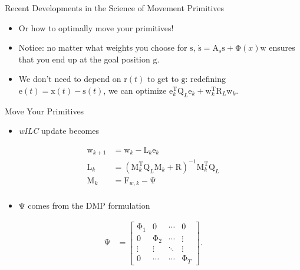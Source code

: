 \documentclass[handout]{beamer}
\newcommand{\boldvec}[1]{\boldsymbol{\mathrm{#1}}}
\let\vec\boldvec
\newcommand{\state}{\vec{x}} %
\newcommand{\dmp}{\vec{s}} %
\newcommand{\error}{\vec{e}} %
\newcommand{\traj}{\vec{r}} %
\newcommand{\goal}{\vec{g}} %
\newcommand{\phase}{x} %
\newcommand{\weights}{\vec{w}} %
\newcommand{\basis}{\vec{\Phi}} %
\newcommand{\lmatrix}{\vec{L}} %
\newcommand{\alg}{\emph{wILC }}
\begin{document}
%
\begin{frame}{Recent Developments in the Science of Movement Primitives}
\begin{itemize}
\item Or how to optimally move your primitives!
\item Notice: no matter what weights you choose for $\dmp$, $\dot{\dmp} = \vec{A}_s \dmp + \basis(\phase) \weights$ ensures that you end up at the goal position $\goal$.
\item We don't need to depend on $\traj(t)$ to get to $\goal$: redefining $\error(t) = \state(t) - \dmp(t)$, we can optimize $\error_k^{\mathrm{T}}\vec{Q}_L\error_k + \weights_k^{\mathrm{T}}\vec{R}_L\weights_k$.
\end{itemize}
\end{frame}
%
\begin{frame}{Move Your Primitives}
\begin{itemize}
\item \alg update becomes
\end{itemize}
\begin{equation*}
\begin{aligned}
\weights_{k+1} &= \weights_{k} - \lmatrix_k\error_{k} \\
\lmatrix_k &= (\vec{M}_{k}^{\mathrm{T}}\vec{Q}_L\vec{M}_k + \vec{R})^{-1}\vec{M}_k^{\mathrm{T}}\vec{Q}_L \\
\vec{M}_k &= \vec{F}_{w,k} - \vec{\Psi} \\
\end{aligned}
\end{equation*}
\begin{itemize}
\item $\vec{\Psi}$ comes from the DMP formulation
\end{itemize}
\begin{equation*}
\begin{aligned}
\vec{\Psi} &= \begin{bmatrix}
  \vec{\Phi}_{1} & \vec{0} & \cdots & \vec{0} \\
  \vec{0} & \vec{\Phi}_{2} & \cdots & \vdots \\
  \vdots  & \vdots  & \ddots &  \vdots \\
  \vec{0} & \cdots & \cdots & \vec{\Phi}_T
 \end{bmatrix}.
\end{aligned}
\end{equation*}
\end{frame}
%
\end{document}
